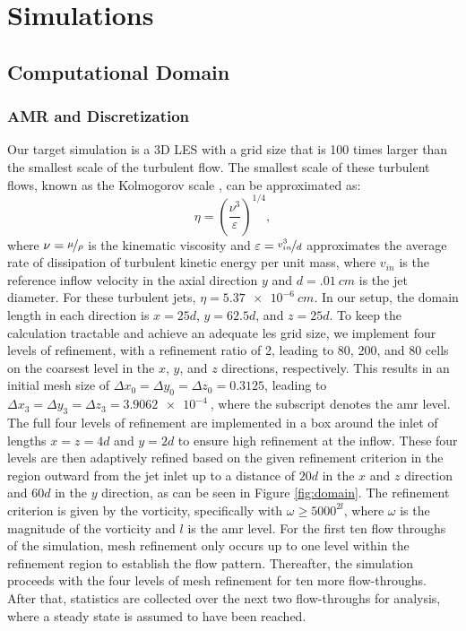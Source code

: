 \chapter{Simulations}


\section{Computational Domain}
\subsection{AMR and Discretization}
Our target simulation is a 3D LES with a grid size that is 100 times larger than the smallest scale of the turbulent flow. The smallest scale of these turbulent flows, known as the Kolmogorov scale \cite{kolmogorov}, can be approximated as:
\begin{equation} \label{Kolmogorov}
	\eta = \left( \dfrac{\nu^3}{\varepsilon} \right)^{1/4},
\end{equation}
where $\nu = \nicefrac{\mu}{\rho}$ is the kinematic viscosity and $\varepsilon = \nicefrac{v_{in}^3}{d}$ approximates the average rate of dissipation of turbulent kinetic energy per unit mass, where $v_{in}$ is the reference inflow velocity in the axial direction $y$ and $d=\SI{.01}{cm}$ is the jet diameter. For these turbulent jets, $\eta = \SI{5.37e-6}{cm}$. In our setup, the domain length in each direction is $x = 25d$, $y = 62.5d$, and $z = 25d$. To keep the calculation tractable and achieve an adequate \gls{les} grid size, we implement four levels of refinement, with a refinement ratio of 2, leading to 80, 200, and 80 cells on the coarsest level in the $x$, $y$, and $z$ directions, respectively. This results in an initial mesh size of $\Delta x_{0}=\Delta y_{0}=\Delta z_{0}=0.3125$, leading to $\Delta x_{3}=\Delta y_{3}=\Delta z_{3}=\SI{3.9062e-4}{}$, where the subscript denotes the \gls{amr} level. The full four levels of refinement are implemented in a box around the inlet of lengths $x=z=4d$ and $y=2d$ to ensure high refinement at the inflow. These four levels are then adaptively refined based on the given refinement criterion in the region outward from the jet inlet up to a distance of $20d$ in the $x$ and $z$ direction and $60d$ in the $y$ direction, as can be seen in Figure \ref{fig:domain}. The refinement criterion is given by the vorticity, specifically with $\omega \geq 5000^{2l}$, where $\omega$ is the magnitude of the vorticity and $l$ is the \gls{amr} level. For the first ten flow throughs of the simulation, mesh refinement only occurs up to one level within the refinement region to establish the flow pattern. Thereafter, the simulation proceeds with the four levels of mesh refinement for ten more flow-throughs. After that, statistics are collected over the next two flow-throughs for analysis, where a steady state is assumed to have been reached.
